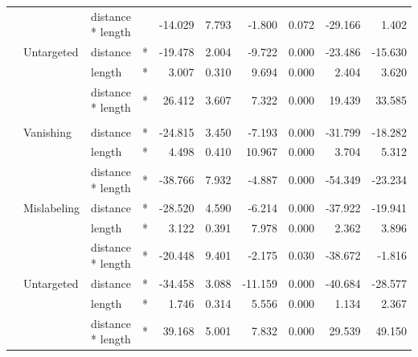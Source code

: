 \begin{longtable}[t]{llllrrrrrr}
\cmidrule{3-10}\nopagebreak
\hspace{1em} &  & distance * length &  & -14.029 & 7.793 & -1.800 & 0.072 & -29.166 & 1.402\\
\cmidrule{2-10}\nopagebreak
\hspace{1em} & Untargeted & distance & * & -19.478 & 2.004 & -9.722 & 0.000 & -23.486 & -15.630\\
\cmidrule{3-10}\nopagebreak
\hspace{1em} &  & length & * & 3.007 & 0.310 & 9.694 & 0.000 & 2.404 & 3.620\\
\cmidrule{3-10}\nopagebreak
\hspace{1em} &  & distance * length & * & 26.412 & 3.607 & 7.322 & 0.000 & 19.439 & 33.585\\
\cmidrule{1-10}\pagebreak[0]
\addlinespace[0.3em]
\multicolumn{10}{l}{\textbf{Cascade R-CNN}}\\
\hspace{1em} & Vanishing & distance & * & -24.815 & 3.450 & -7.193 & 0.000 & -31.799 & -18.282\\
\cmidrule{3-10}\nopagebreak
\hspace{1em} &  & length & * & 4.498 & 0.410 & 10.967 & 0.000 & 3.704 & 5.312\\
\cmidrule{3-10}\nopagebreak
\hspace{1em} &  & distance * length & * & -38.766 & 7.932 & -4.887 & 0.000 & -54.349 & -23.234\\
\cmidrule{2-10}\nopagebreak
\hspace{1em} & Mislabeling & distance & * & -28.520 & 4.590 & -6.214 & 0.000 & -37.922 & -19.941\\
\cmidrule{3-10}\nopagebreak
\hspace{1em} &  & length & * & 3.122 & 0.391 & 7.978 & 0.000 & 2.362 & 3.896\\
\cmidrule{3-10}\nopagebreak
\hspace{1em} &  & distance * length & * & -20.448 & 9.401 & -2.175 & 0.030 & -38.672 & -1.816\\
\cmidrule{2-10}\nopagebreak
\hspace{1em} & Untargeted & distance & * & -34.458 & 3.088 & -11.159 & 0.000 & -40.684 & -28.577\\
\cmidrule{3-10}\nopagebreak
\hspace{1em} &  & length & * & 1.746 & 0.314 & 5.556 & 0.000 & 1.134 & 2.367\\
\cmidrule{3-10}\nopagebreak
\hspace{1em} &  & distance * length & * & 39.168 & 5.001 & 7.832 & 0.000 & 29.539 & 49.150\\
\bottomrule
\end{longtable}
\endgroup{}

